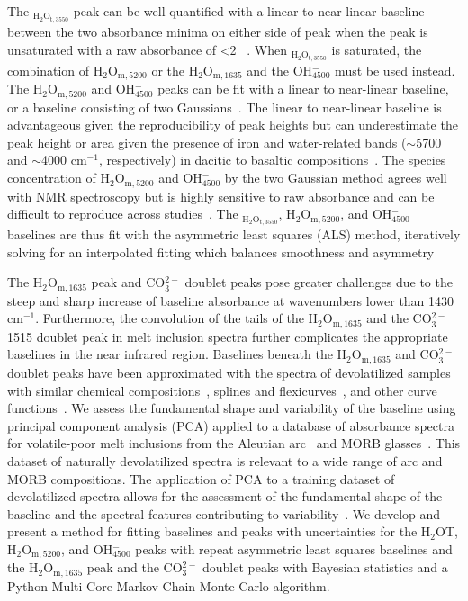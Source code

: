 \documentclass[draft]{agujournal2019}
\begin{document}
The \textepsilon$_{\mathrm{H_2O_{t, 3550}}}$ peak can be well quantified with a linear to near-linear baseline between the two absorbance minima on either side of peak when the peak is unsaturated with a raw absorbance of \textless 2 ~\cite{DixonandStolper1995, vonAulocketal2014}. When \textepsilon$_{\mathrm{H_2O_{t, 3550}}}$ is saturated, the combination of H$_{2}$O$_{\mathrm{m}, 5200}$ or the H$_{2}$O$_{\mathrm{m}, 1635}$ and the OH$^{-}_{4500}$ must be used instead. The H$_{2}$O$_{\mathrm{m}, 5200}$ and OH$^{-}_{4500}$ peaks can be fit with a linear to near-linear baseline, or a baseline consisting of two Gaussians~\cite{Ohlhorstetal2001, Stabileetal2020, Stolper1982, WithersandBehrens1999}. The linear to near-linear baseline is advantageous given the reproducibility of peak heights but can underestimate the peak height or area given the presence of iron and water-related bands ($\sim$5700 and $\sim$4000 cm$^{-1}$, respectively) in dacitic to basaltic compositions~\cite{Ohlhorstetal2001}. The species concentration of H$_{2}$O$_{\mathrm{m}, 5200}$ and OH$^{-}_{4500}$ by the two Gaussian method agrees well with NMR spectroscopy but is highly sensitive to raw absorbance and can be difficult to reproduce across studies~\cite{Ohlhorstetal2001}. The \textepsilon$_{\mathrm{H_2O_{t, 3550}}}$, H$_{2}$O$_{\mathrm{m}, 5200}$, and OH$^{-}_{4500}$ baselines are thus fit with the asymmetric least squares (ALS) method, iteratively solving for an interpolated fitting which balances smoothness and asymmetry~\cite{Eilers2004, Leeetal2017, Pengetal2010}

The H$_{2}$O$_{\mathrm{m}, 1635}$ peak and CO$_{3}^{2-}$ doublet peaks pose greater challenges due to the steep and sharp increase of baseline absorbance at wavenumbers lower than 1430 cm$^{-1}$. Furthermore, the convolution of the tails of the H$_{2}$O$_{\mathrm{m}, 1635}$ and the CO$_{3}^{2-}$1515 doublet peak in melt inclusion spectra further complicates the appropriate baselines in the near infrared region. Baselines beneath the H$_{2}$O$_{\mathrm{m}, 1635}$ and CO$_{3}^{2-}$ doublet peaks have been approximated with the spectra of devolatilized samples with similar chemical compositions~\cite{Dixonetal1988, Newmanetal2000}, splines and flexicurves~\cite{DixonandStolper1995}, and other curve functions~\cite{DixonandClague2001}. We assess the fundamental shape and variability of the baseline using principal component analysis (PCA) applied to a database of absorbance spectra for volatile-poor melt inclusions from the Aleutian arc~\cite{RasmussenThesis} and MORB glasses~\cite{Newmanetal2000}. This dataset of naturally devolatilized spectra is relevant to a wide range of arc and MORB compositions. The application of PCA to a training dataset of devolatilized spectra allows for the assessment of the fundamental shape of the baseline and the spectral features contributing to variability~\cite{Carvajaletal2016}. We develop and present a method for fitting baselines and peaks with uncertainties for the H$_{2}$OT, H$_{2}$O$_{\mathrm{m}, 5200}$, and OH$^{-}_{4500}$ peaks with repeat asymmetric least squares baselines and the H$_{2}$O$_{\mathrm{m}, 1635}$ peak and the CO$_{3}^{2-}$ doublet peaks with Bayesian statistics and a Python Multi-Core Markov Chain Monte Carlo algorithm. 
\end{document}
